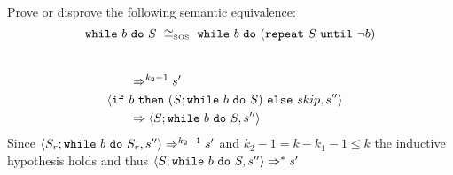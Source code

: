 \begin{exercise}{
    Prove or disprove the following semantic equivalence:
    \[ \wwhile{b}{S}\ \SOScong\ \wwhile{b}{(\wrepeat{S}{\neg b})}  \]
}
\begin{itemize}
\begin{itemize}
\begin{itemize}
\begin{itemize}
\begin{align*}
                                    \\&\qquad\Rightarrow^{k_2 - 1} s'
                                    \\
                                    &\left<\texttt{if}\ b\ \texttt{then}\ (S; \texttt{while}\ b\ \texttt{do}\ S)\ \texttt{else}\ skip, s''\right>
                                    \\&\qquad\Rightarrow \left<S; \texttt{while}\ b\ \texttt{do}\ S, s''\right>
                                \end{align*}
                                Since $\left<S_r; \texttt{while}\ b\ \texttt{do}\ S_r, s''\right> \Rightarrow^{k_2 - 1} s'$ and $k_2 - 1 = k - k_1 - 1 \leq k$ the inductive hypothesis holds and thus $\left<S; \texttt{while}\ b\ \texttt{do}\ S, s''\right> \Rightarrow^* s'$
                        \end{itemize}
                    \end{itemize}
            \end{itemize}
    \end{itemize}
\end{exercise}
